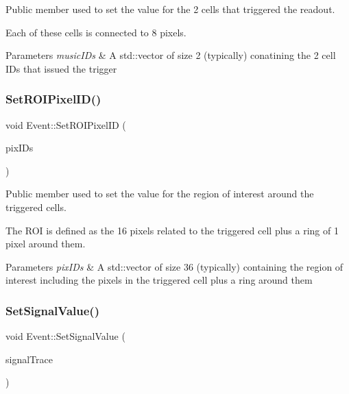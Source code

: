 Public member used to set the value for the 2 cells that triggered the readout. 

Each of these cells is connected to 8 pixels. 
\begin{DoxyParams}{Parameters}
{\em music\+I\+Ds} & A std\+::vector of size 2 (typically) conatining the 2 cell I\+Ds that issued the trigger \\
\hline
\end{DoxyParams}
\mbox{\label{classEvent_afd0ba9e203e0619bc8022bb4579d9eea}} 
\subsubsection{\texorpdfstring{Set\+R\+O\+I\+Pixel\+I\+D()}{SetROIPixelID()}}
{\footnotesize\ttfamily void Event\+::\+Set\+R\+O\+I\+Pixel\+ID (\begin{DoxyParamCaption}\item[{vector$<$ Int\+\_\+t $>$}]{pix\+I\+Ds }\end{DoxyParamCaption})}



Public member used to set the value for the region of interest around the triggered cells. 

The R\+OI is defined as the 16 pixels related to the triggered cell plus a ring of 1 pixel around them. 
\begin{DoxyParams}{Parameters}
{\em pix\+I\+Ds} & A std\+::vector of size 36 (typically) containing the region of interest including the pixels in the triggered cell plus a ring around them \\
\hline
\end{DoxyParams}
\mbox{\label{classEvent_a7d14a089a358b6ac34b19db29b37d089}} 
\subsubsection{\texorpdfstring{Set\+Signal\+Value()}{SetSignalValue()}}
{\footnotesize\ttfamily void Event\+::\+Set\+Signal\+Value (\begin{DoxyParamCaption}\item[{vector$<$ vector$<$ Int\+\_\+t $>$$>$}]{signal\+Trace }\end{DoxyParamCaption})}



